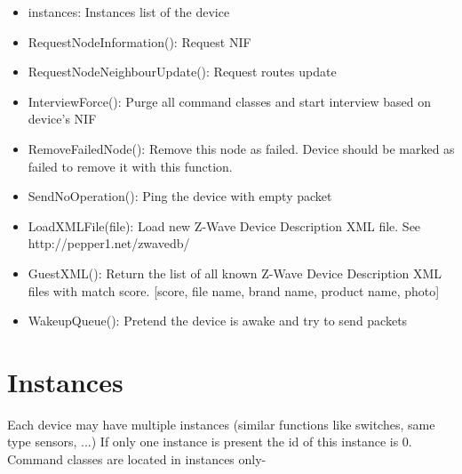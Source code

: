 \begin {itemize}
\begin {itemize}
\begin {itemize}
\item neightbours: list of neighbour nodes
\item nodeInfoFrame: nodeinformation frame in bytes
\item option: flag if optional command classes are present
\item queueLength: length of device specific send queue
\item sensor1000: flag if device is FLIRS with 1000 ms wakeup 
\item sensor250: flag if device is FLIRS with 250 ms wakeup 
\item specificType: specific Z-Wave device class
\end {itemize}
\item instances: Instances list of the device
\item RequestNodeInformation(): Request NIF
\item RequestNodeNeighbourUpdate(): Request routes update
\item InterviewForce(): Purge all command classes and start interview based on device's NIF
\item RemoveFailedNode(): Remove this node as failed. Device should be marked as failed to remove it with this function.
\item SendNoOperation(): Ping the device with empty packet
\item LoadXMLFile(file): Load new Z-Wave Device Description XML file. See http://pepper1.net/zwavedb/
\item GuestXML(): Return the list of all known Z-Wave Device Description XML files with match score. [score, file name, brand name, product name, photo]
\item WakeupQueue(): Pretend the device is awake and try to send packets
\end {itemize}
\end {itemize}

\section{Instances}

Each device may have multiple instances (similar functions like switches, same type sensors, ...) If only one instance 
is present the id of this instance is 0. Command classes are located in instances only-

